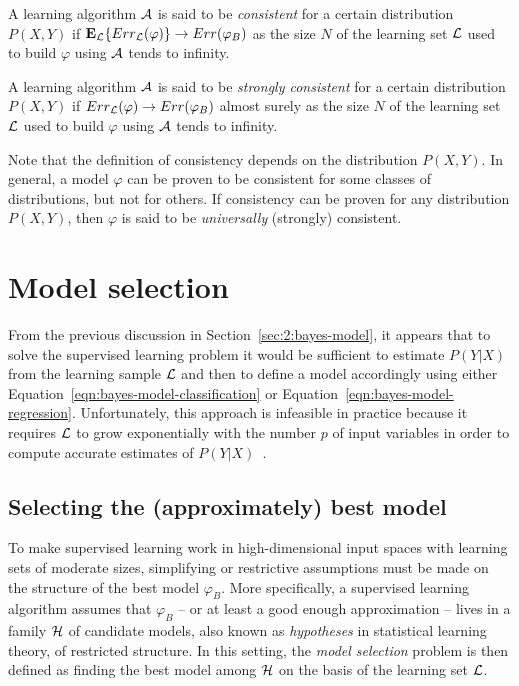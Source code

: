 \begin{definition}
A learning algorithm ${\cal A}$ is said to be \emph{consistent} for a certain distribution
$P(X, Y)$ if $\mathbf{E}_{\cal L} \{ Err_{\cal L}(\varphi) \} \to Err(\varphi_B)$
as the size $N$ of the learning set ${\cal L}$ used to build $\varphi$ using ${\cal A}$ tends
to infinity.
\end{definition}

\begin{definition}
A learning algorithm ${\cal A}$ is said to be \emph{strongly consistent} for a certain distribution
$P(X, Y)$ if $Err_{\cal L}(\varphi) \to Err(\varphi_B)$ almost surely
as the size $N$ of the learning set ${\cal L}$ used to build $\varphi$ using ${\cal A}$ tends
to infinity.
\end{definition}

Note that the definition of consistency depends on the distribution $P(X, Y)$.
In general, a model $\varphi$ can be proven to be consistent for some
classes of distributions, but not for others. If consistency can be proven
for any distribution $P(X, Y)$, then $\varphi$ is said to be \textit{universally}
(strongly) consistent.


\section{Model selection}
\label{sec:2:model-selection}

From the previous discussion in Section~\ref{sec:2:bayes-model}, it appears that
to solve the supervised learning problem it would be sufficient to estimate
$P(Y|X)$ from the learning sample ${\cal L}$ and then to define a model
accordingly using either Equation~\ref{eqn:bayes-model-classification} or
Equation~\ref{eqn:bayes-model-regression}. Unfortunately, this approach is
infeasible in practice because it requires ${\cal L}$ to grow exponentially
with the number $p$ of input variables in order to compute accurate estimates of
$P(Y|X)$~\citep{geurts:2002}.

\subsection{Selecting the (approximately) best model}

To make supervised learning work in high-dimensional input spaces with learning
sets of moderate sizes, simplifying or restrictive assumptions must be made on
the structure of the best model $\varphi_B$. More specifically, a supervised
learning algorithm assumes that $\varphi_B$ -- or at least a good enough approximation
-- lives in a family ${\cal H}$ of candidate models, also known as
\textit{hypotheses} in statistical learning theory, of restricted structure. In
this setting, the \textit{model selection} problem is then defined as finding
the best model among ${\cal H}$ on the basis of the learning set ${\cal L}$.

